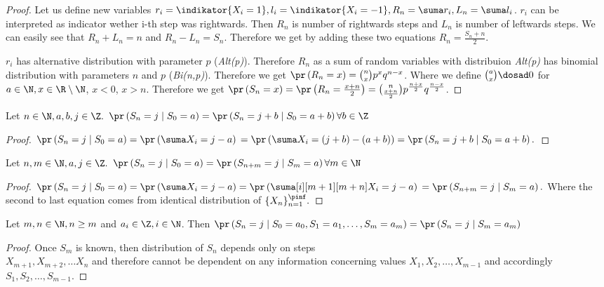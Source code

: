 \begin{proof}
 Let us define new variables $r_i=\indikator{X_i=1}, l_i=\indikator{X_i=-1}, R_n=\suma r_i, L_n=\suma l_i$.
 $r_i$ can be interpreted as indicator wether i-th step was rightwards. Then $R_n$ is number of rightwards steps and $L_n$ is number of leftwards steps. We can easily see that $R_n+L_n=n$ and $R_n-L_n=S_n$.
 Therefore we get by adding these two equations $R_n=\frac{S_n+n}{2}.$

 $r_i$ has alternative distribution with parameter $p$ (\textit{Alt(p)}). Therefore $R_n$ as a sum of \iid random variables with distribuion \textit{Alt(p)} has binomial distribution with parameters $n$ and $p$ (\textit{Bi(n,p)}).
 Therefore we get $\pr \left(R_n=x \right) =\binom{n}{x}p^{x}q^{n-x}$. Where we define $\binom{a}{x}\dosad 0$ for $a \in \N, x\in \R \setminus \N$, $x<0$, $x>n$.
 Therefore we get $\pr \left( S_n=x \right) =\pr\left( R_n=\frac{x+n}{2} \right) = \binom{n}{\frac{x+n}{2}}p^{\frac{n+x}{2}}q^{\frac{n-x}{2}}$.
\end{proof}
\begin{lemma}\label{lemma-spatial_homogeneity}
  Let $n \in \N, a,b,j \in \Z.$
 $\pr \left( S_n=j \mid S_0=a \right) =\pr \left( S_n=j+b \mid S_0=a+b \right) \forall b \in \Z$
\end{lemma}

\begin{proof}
 $\pr \left( S_n=j \mid S_0=a \right) =\pr \left( \suma X_i=j-a \right)\\
 =\pr \left( \suma X_i= \left( j+b \right) - \left( a+b \right) \right)
 =\pr \left( S_n=j+b \mid S_0=a+b \right).$
\end{proof}


\begin{lemma}\label{lemma-temporal_homogeneity}
  Let $n,m \in \N, a,j \in \Z.$
 $\pr \left( S_n=j \mid S_0=a \right) =\pr \left( S_{n+m}=j \mid S_m=a \right) \forall m \in \N$
\end{lemma}
\begin{proof}
 $\pr \left( S_n=j \mid S_0=a \right) =\pr \left( \suma X_i=j-a \right)
 =\pr \left( \suma[i][m+1][m+n]X_i=j-a \right)\\
 =\pr \left( S_{n+m}=j \mid S_m=a \right).$
 Where the second to last equation comes from identical distribution of $\{X_n\}_{n=1}^{\pinf}.$
\end{proof}

\begin{lemma}\label{lemma-markov_property}
 Let $m,n \in \N, n\geq m$ and $a_i \in \Z, i\in \N$. Then $\pr \left( S_n=j \mid S_0=a_0, S_1=a_1, \ldots, S_m=a_m \right)
 =\pr \left( S_n=j \mid S_m=a_m \right) $
\end{lemma}
\begin{proof}
 Once $S_m$ is known, then distribution of $S_n$ depends only on steps ~\\$X_{m+1}, X_{m+2}, \ldots X_n$ and therefore cannot be dependent on any information concerning values $X_1, X_2, \ldots, X_{m-1}$ and accordingly $S_1, S_2, \ldots, S_{m-1}.$
\end{proof}


